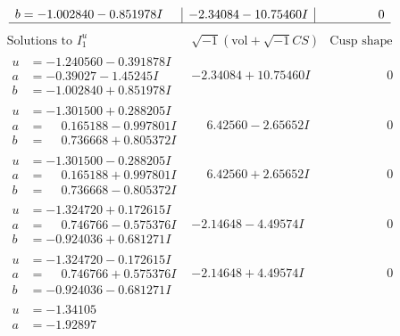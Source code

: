 \documentclass[1p]{elsarticle_modified}
\theoremstyle{definition}
\newcommand{\I}{\sqrt{-1}}
\begin{document}
$$\begin{array}{c|c|c}
\begin{aligned}
b &= -1.002840 - 0.851978 I\end{aligned}
 & -2.34084 - 10.75460 I & \phantom{-0.000000 } 0\\
 \hline 
 \end{array}$$\newpage$$\begin{array}{c|c|c}  
\text{Solutions to }I^u_{1}& \I (\text{vol} + \sqrt{-1}CS) & \text{Cusp shape}\\
 \hline 
\begin{aligned}
u &= -1.240560 - 0.391878 I \\
a &= -0.39027 - 1.45245 I \\
b &= -1.002840 + 0.851978 I\end{aligned}
 & -2.34084 + 10.75460 I & \phantom{-0.000000 } 0 \\ \hline\begin{aligned}
u &= -1.301500 + 0.288205 I \\
a &= \phantom{-}0.165188 - 0.997801 I \\
b &= \phantom{-}0.736668 + 0.805372 I\end{aligned}
 & \phantom{-}6.42560 - 2.65652 I & \phantom{-0.000000 } 0 \\ \hline\begin{aligned}
u &= -1.301500 - 0.288205 I \\
a &= \phantom{-}0.165188 + 0.997801 I \\
b &= \phantom{-}0.736668 - 0.805372 I\end{aligned}
 & \phantom{-}6.42560 + 2.65652 I & \phantom{-0.000000 } 0 \\ \hline\begin{aligned}
u &= -1.324720 + 0.172615 I \\
a &= \phantom{-}0.746766 - 0.575376 I \\
b &= -0.924036 + 0.681271 I\end{aligned}
 & -2.14648 - 4.49574 I & \phantom{-0.000000 } 0 \\ \hline\begin{aligned}
u &= -1.324720 - 0.172615 I \\
a &= \phantom{-}0.746766 + 0.575376 I \\
b &= -0.924036 - 0.681271 I\end{aligned}
 & -2.14648 + 4.49574 I & \phantom{-0.000000 } 0 \\ \hline\begin{aligned}
u &= -1.34105\phantom{ +0.000000I} \\
a &= -1.92897\phantom{ +0.000000I} \\

\end{aligned}
\end{array}$$
\end{document}
